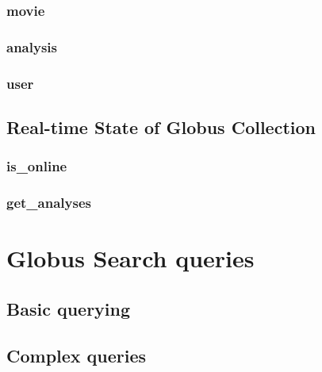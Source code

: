 \documentclass{report}
\begin{document}
\subsection{movie}
\subsection{analysis}
\subsection{user}
\section{Real-time State of Globus Collection}
\subsection{is\_online}
\subsection{get\_analyses}

\chapter{Globus Search queries}
\section{Basic querying}
\section{Complex queries}
\end{document}
